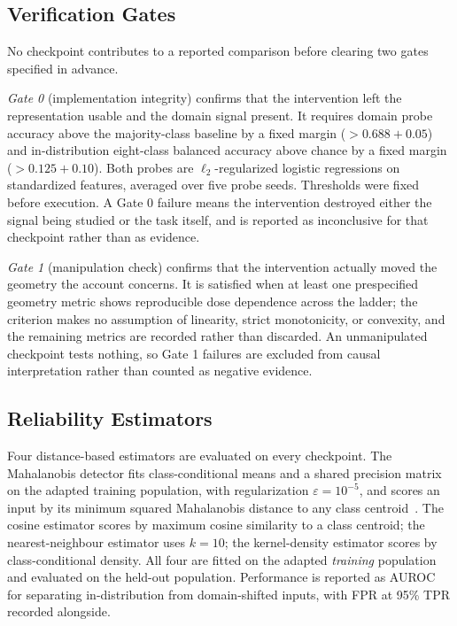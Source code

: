 \subsection{Verification Gates}

No checkpoint contributes to a reported comparison before clearing two gates
specified in advance.

\emph{Gate 0} (implementation integrity) confirms that the intervention left
the representation usable and the domain signal present. It requires domain
probe accuracy above the majority-class baseline by a fixed margin
($> 0.688 + 0.05$) and in-distribution eight-class balanced accuracy above
chance by a fixed margin ($> 0.125 + 0.10$). Both probes are
$\ell_2$-regularized logistic regressions on standardized features, averaged
over five probe seeds. Thresholds were fixed before execution. A Gate 0
failure means the intervention destroyed either the signal being studied or
the task itself, and is reported as inconclusive for that checkpoint rather
than as evidence.

\emph{Gate 1} (manipulation check) confirms that the intervention actually
moved the geometry the account concerns. It is satisfied when at least one
prespecified geometry metric shows reproducible dose dependence across the
ladder; the criterion makes no assumption of linearity, strict monotonicity,
or convexity, and the remaining metrics are recorded rather than discarded.
An unmanipulated checkpoint tests nothing, so Gate 1 failures are excluded
from causal interpretation rather than counted as negative evidence.

\subsection{Reliability Estimators}
\label{sec:estimators}

Four distance-based estimators are evaluated on every checkpoint. The
Mahalanobis detector fits class-conditional means and a shared precision
matrix on the adapted training population, with regularization
$\varepsilon = 10^{-5}$, and scores an input by its minimum squared
Mahalanobis distance to any class centroid~\cite{lee2018simple}. The cosine
estimator scores by maximum cosine similarity to a class centroid; the
nearest-neighbour estimator uses $k = 10$; the kernel-density estimator scores
by class-conditional density. All four are fitted on the adapted
\emph{training} population and evaluated on the held-out population.
Performance is reported as AUROC for separating in-distribution from
domain-shifted inputs, with FPR at 95\% TPR recorded alongside.


